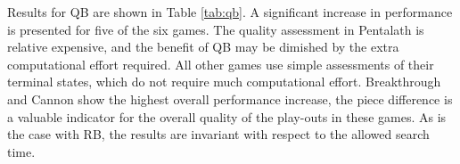 \documentclass{ecai2014}
\begin{document}
\begin{table}
{\caption{Qualitative Bonus using different search times, 5000 games} \label{tab:qb}}
\tabcolsep=0.15cm
\centering
{}
\end{table}

Results for QB are shown in Table \ref{tab:qb}. A significant increase in performance is presented for five of the six games. The quality assessment in Pentalath is relative expensive, and the benefit of QB may be dimished by the extra computational effort required. All other games use simple assessments of their terminal states, which do not require much computational effort. Breakthrough and Cannon show the highest overall performance increase, the piece difference is a valuable indicator for the overall quality of the play-outs in these games. As is the case with RB, the results are invariant with respect to the allowed search time.
\end{document}
